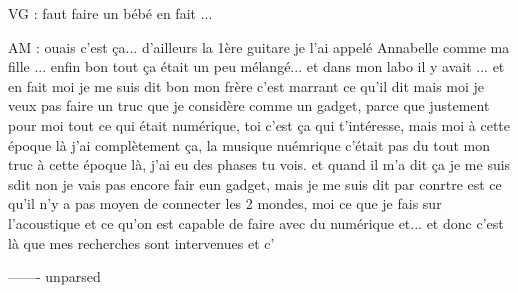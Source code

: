 VG : faut faire un bébé en fait ...

AM : ouais c'est ça... d'ailleurs la 1ère guitare je l'ai appelé Annabelle comme ma fille ... enfin bon tout ça était un peu mélangé...
et dans mon labo il y avait ... et en fait moi je me suis dit bon mon frère c'est marrant ce qu'il dit mais moi je veux pas faire un truc que je considère comme un gadget, parce que justement pour moi tout ce qui était numérique, toi c'est ça qui t'intéresse, mais moi à cette époque là j'ai complètement ça, la musique nuémrique c'était pas du  tout mon truc à cette époque là, j'ai eu des phases tu vois.
et quand il m'a dit ça je me suis sdit non je vais pas encore fair eun gadget,  mais je me suis dit par conrtre est ce qu'il n'y a pas moyen de connecter les 2 mondes, moi ce que je fais sur l'acoustique et ce qu'on est capable de faire avec du numérique et... 
et donc c'est là que mes recherches  sont intervenues et c'

 ------- unparsed

